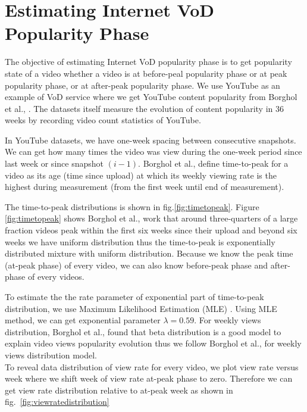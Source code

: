 \section{Estimating Internet VoD Popularity Phase}\label{popularity}
The objective of estimating Internet VoD popularity phase is to get popularity state of a video whether a video is at before-peal popularity phase or at peak popularity phase, or at after-peak popularity phase.
We use YouTube as an example of VoD service where we get YouTube content popularity from Borghol et al., \cite{Borghol:2011:CMP:2039452.2039717}.
The datasets itself measure the evolution of content popularity in 36 weeks by recording video count statistics of YouTube.

In YouTube datasets, we have one-week spacing between consecutive snapshots.  
We can get how many times the video was view during the one-week period since last week or since snapshot $(i-1)$. 
Borghol et al., \cite{Borghol:2011:CMP:2039452.2039717} define time-to-peak for a video as its age (time since upload) at which its weekly viewing rate is the highest during measurement (from the first week until end of measurement).

The time-to-peak distributions is shown in fig.\ref{fig:timetopeak}.
Figure \ref{fig:timetopeak} shows Borghol et al., \cite{Borghol:2011:CMP:2039452.2039717} work that around three-quarters of a large fraction videos peak within the first six weeks since their upload and beyond six weeks we have uniform distribution thus the time-to-peak is exponentially distributed mixture with uniform distribution. 
Because we know the peak time (at-peak phase) of every video, we can also know before-peak phase and after-phase of every videos.

To estimate the the rate parameter of exponential part of time-to-peak distribution, we use Maximum Likelihood Estimation (MLE) \cite{clauset2009power}.
Using MLE method, we can get exponential parameter $\lambda = 0.59$.
For weekly views distribution, Borghol et al., \cite{Borghol:2011:CMP:2039452.2039717} found that beta distribution is a good model to explain video views popularity evolution thus we follow Borghol et al., \cite{Borghol:2011:CMP:2039452.2039717} for  weekly views distribution model.\\
To reveal data distribution of view rate for every video, we plot view rate versus week where we shift week of view rate at-peak phase to zero. 
Therefore we can get view rate distribution relative to at-peak week as shown in fig.~\ref{fig:viewratedistribution}



